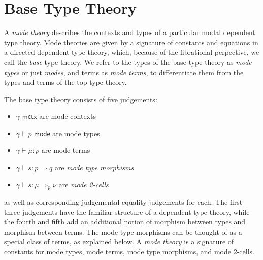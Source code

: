 \documentclass[10pt]{article}
\theoremstyle{definition}
\newcommand{\yields}{\vdash}
\newcommand{\tcell}{\Rightarrow}
\newcommand{\ctx}{\,\,\mathsf{mctx}}
\newcommand{\type}{\,\,\mathsf{mode}}
\newcommand\TypeTwo[4]{\ensuremath{#1 \vdash #2 :  #3 \tcell #4}}
\newcommand\TermTwoT[5]{\ensuremath{#1 \vdash {#2} : #3 \tcell_{#5} #4}}
\begin{document}





\section{Base Type Theory}
\label{sec:base-syntax}

A \emph{mode theory} describes the contexts and types of a particular
modal dependent type theory.  Mode theories are given by a signature of
constants and equations in a directed dependent type theory, which,
because of the fibrational perpective, we call the \emph{base} type
theory.  We refer to the types of the base type theory as \emph{mode
  types} or just \emph{modes}, and terms as \emph{mode terms}, to
differentiate them from the types and terms of the top type theory.

The base type theory consists of five judgements:
\begin{itemize}
\item $\gamma \ctx$ are mode contexts
\item $\gamma \yields p \type$ are mode types
\item $\gamma \yields \mu : p$ are mode terms
\item $\TypeTwo{\gamma}{s}{p}{q}$ are \emph{mode type morphisms}
\item $\TermTwoT{\gamma}{s}{\mu}{\nu}{p}$ are \emph{mode 2-cells}
\end{itemize}
as well as corresponding judgemental equality judgements for each.
The first three judgements have the familiar structure of a dependent
type theory, while the fourth and fifth add an additional notion of
morphism between types and morphism between terms.  The mode type
morphisms can be thought of as a special class of terms, as explained
below.  A \emph{mode theory} is a signature of constants for mode types,
mode terms, mode type morphisms, and mode 2-cells.
\end{document}

